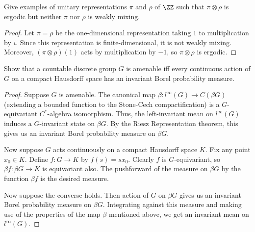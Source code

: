 \documentclass{article}
\begin{document}
 Give examples of unitary representations $\pi$ and $\rho$ of $\ZZ$ such that $\pi \otimes \rho$ is ergodic but neither $\pi$ nor $\rho$ is weakly mixing.
\begin{proof}
Let $\pi = \rho$ be the one-dimensional representation taking $1$ to multiplication by $i$.  Since this representation is finite-dimensional, it is not weakly mixing. Moreover, $(\pi \otimes \rho)(1)$ acts by multiplication by $-1$, so $\pi \otimes \rho$ is ergodic.
\end{proof}

%
%
%
%
%

 Show that a countable discrete group $G$ is amenable iff every continuous action of $G$ on a compact Hausdorff space has an invariant Borel probability measure.
\begin{proof}
Suppose $G$ is amenable.  The canonical map $\beta:l^\infty(G) \to C(\beta G)$ (extending a bounded function to the Stone-Cech compactification) is a $G$-equivariant $C^*$-algebra isomorphism. Thus, the left-invariant mean on $l^\infty(G)$ induces a $G$-invariant state on $\beta G$.  By the Riesz Representation theorem, this gives us an invariant Borel probability measure on $\beta G$.

Now  suppose $G$ acts continuously on a compact Hausdorff space $K$. Fix any point $x_0 \in K$. Define $f:G \to K$ by $f(s) = sx_0$. Clearly $f$ is $G$-equivariant, so $\beta f: \beta G \to K$ is equivariant also. The pushforward of the measure on $\beta G$ by the function $\beta f$ is the desired measure.

Now suppose the converse holds. Then action of $G$ on $\beta G$ gives us an invariant Borel probability measure on $\beta G$. Integrating against this measure and making use of the properties of the map $\beta$ mentioned above, we get an invariant mean on $l^\infty(G)$.
\end{proof}
\end{document}
